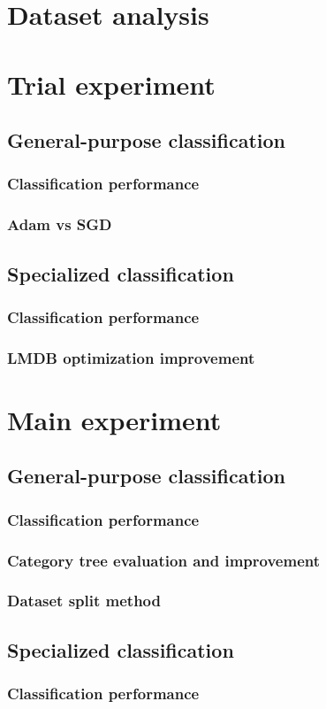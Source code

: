 \section{Dataset analysis}

\section{Trial experiment}
\subsection{General-purpose classification}
    \subsubsection{Classification performance}
    \subsubsection{Adam vs SGD}

\subsection{Specialized classification}
    \subsubsection{Classification performance}
    \subsubsection{LMDB optimization improvement}

\section{Main experiment}
\subsection{General-purpose classification}
    \subsubsection{Classification performance}
    \subsubsection{Category tree evaluation and improvement}
    \subsubsection{Dataset split method}

\subsection{Specialized classification}
    \subsubsection{Classification performance}
